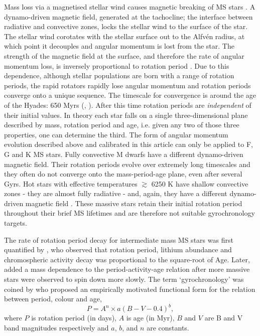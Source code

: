 \documentclass[10pt,preprint]{aastex}
\begin{document}
Mass loss via a magnetised stellar wind causes magnetic breaking of MS stars \citep{Weber1967}.
A dynamo-driven magnetic field, generated at the tachocline; the interface between radiative and convective zones, locks the stellar wind to the surface of the star.
The stellar wind corotates with the stellar surface out to the Alfv\'{e}n radius, at which point it decouples and angular momentum is lost from the star.
The strength of the magnetic field at the surface, and therefore the rate of angular momentum loss, is inversely proportional to rotation period \citep{Kawaler1988}.
Due to this dependence, although stellar populations are born with a range of rotation periods, the rapid rotators rapidly lose angular momentum and rotation periods converge onto a unique sequence.
The timescale for convergence is around the age of the Hyades: 650 Myrs (\citealt{Radick1987}, \citealt{Irwin2009}).
After this time rotation periods are \emph{independent} of their initial values.
In theory each star falls on a single three-dimensional plane described by mass, rotation period and age, i.e. given any two of those three properties, one can determine the third.
The form of angular momentum evolution described above and calibrated in this article can only be applied to F, G and K MS stars.
Fully convective M dwarfs have a different dynamo-driven magnetic field.
Their rotation periods evolve over extremely long timescales and they often do not converge onto the mass-period-age plane, even after several Gyrs.
Hot stars with effective temperatures $\gtrsim$ 6250 K have shallow convective zones - they are almost fully radiative - and, again, they have a different dynamo-driven magnetic field \citep{Kraft1967}.
These massive stars retain their initial rotation period throughout their brief MS lifetimes and are therefore not suitable gyrochronology targets.

The rate of rotation period decay for intermediate mass MS stars was first quantified by \citet{Skumanich1972}, who observed that rotation period, lithium abundance and chromospheric activity decay was proportional to the square-root of Age.
Later, \citet{Noyes1984_2} added a mass dependence to the period-activity-age relation after more massive stars were observed to spin down more slowly.
The term `gyrochronology' was coined by \citet{Barnes2003} who proposed an empirically motivated functional form for the relation between period, colour and age,
\begin{equation}
P = A^n \times a(B-V-0.4)^b,
\label{eq:Barnes2007_2}
\end{equation}
where $P$ is rotation period (in days), $A$ is age (in Myr), $B$ and $V$ are B and V band magnitudes respectively and $a$, $b$, and $n$ are constants.
\end{document}
